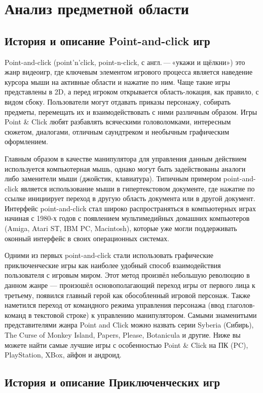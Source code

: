 \section{Анализ предметной области}
\subsection{История и описание Point-and-click игр}

Point-and-click (point’n’click, point-n-click, с англ. — «укажи и щёлкни»)  это жанр видеоигр, где ключевым элементом игрового процесса является наведение курсора мыши на активные области и нажатие по ним. Чаще такие игры представлены в 2D, а перед игроком открывается область-локация, как правило, с видом сбоку. Пользователи могут отдавать приказы персонажу, собирать предметы, перемещать их и взаимодействовать с ними различным образом. Игры Point \& Click любят разбавлять всяческими головоломками, интересным сюжетом, диалогами, отличным саундтреком и необычным графическим оформлением.

Главным образом в качестве манипулятора для управления данным действием используется компьютерная мышь, однако могут быть задействованы аналоги либо заменители мыши (джойстик, клавиатура). Типичным примером point-and-click является использование мыши в гипертекстовом документе, где нажатие по ссылке инициирует переход в другую область документа или в другой документ.
Интерфейс point-and-click стал широко распространяться в компьютерных играх начиная с 1980-х годов с появлением мультимедийных домашних компьютеров (Amiga, Atari ST, IBM PC, Macintosh), которые уже могли поддерживать оконный интерфейс в своих операционных системах.

Одними из первых point-and-click стали использовать графические приключенческие игры как наиболее удобный способ взаимодействия пользователя с игровым миром. Этот метод произвёл небольшую революцию в данном жанре — произошёл основополагающий переход игры от первого лица к третьему, появился главный герой как обособленный игровой персонаж. Также наметился переход от командного режима управления персонажа (ввод глаголов-команд в текстовой строке) к управлению манипулятором. 
Самыми знаменитыми представителями жанра Point and Click можно назвать серии Syberia (Сибирь), The Curse of Monkey Island, Papers, Please, Botanicula и другие. Ниже вы можете найти самые лучшие игры с особенностью Point \& Click на ПК (PC), PlayStation, XBox, айфон и андроид.

\subsection{История и описание Приключенческих игр}

